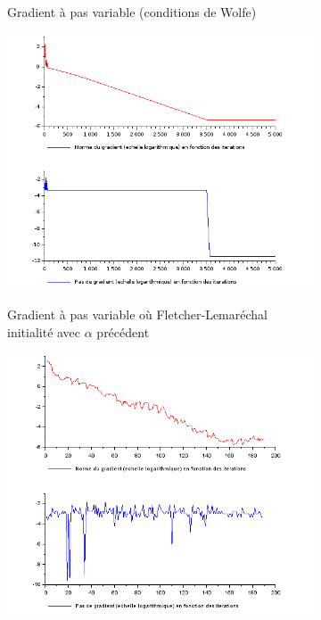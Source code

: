 \documentclass{article}
\begin{document}
\begin{figure}
\begin{subfigure}[t]{.4\textwidth}
            \label{fig:pas_variable}
            \caption{Gradient à pas variable (conditions de Wolfe)}
        \end{subfigure}
        \hfill
        \begin{subfigure}[t]{.4\textwidth}
            \includegraphics[width=\textwidth]{../Images/pas_variable_initAlpha.png}
            \label{fig:pas_variableAlpha}
            \caption{Gradient à pas variable où Fletcher-Lemaréchal initialité avec $\alpha$ précédent}
        \end{subfigure}
        \hfill
        \begin{subfigure}[t]{.4\textwidth}
            \includegraphics[width=\textwidth]{../Images/Polak_Ribiere.png}

\end{subfigure}
\end{figure}
\end{document}
